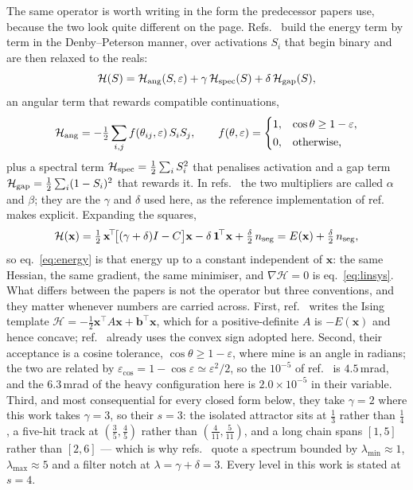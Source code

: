 \documentclass[11pt,a4paper]{article}
\begin{document}
The same operator is worth writing in the form the predecessor papers
use, because the two look quite different on the page.
Refs.~\cite{nicotra2023,trackhhl_epj,trackhhl} build the energy term by
term in the Denby--Peterson manner, over activations $S_i$ that begin
binary and are then relaxed to the reals:
\begin{equation}
\mathcal{H}(S)=\mathcal{H}_{\rm ang}(S,\varepsilon)
+\gamma\,\mathcal{H}_{\rm spec}(S)+\delta\,\mathcal{H}_{\rm gap}(S),
\label{eq:dpform}
\end{equation}
an angular term that rewards compatible continuations,
\[
\mathcal{H}_{\rm ang}=-\tfrac12\sum_{i,j}f(\theta_{ij},\varepsilon)\,S_iS_j,
\qquad
f(\theta,\varepsilon)=
\begin{cases}1,&\cos\theta\ge1-\varepsilon,\\[2pt] 0,&\text{otherwise,}\end{cases}
\]
plus a spectral term $\mathcal{H}_{\rm spec}=\tfrac12\sum_iS_i^{2}$ that
penalises activation and a gap term
$\mathcal{H}_{\rm gap}=\tfrac12\sum_i(1-S_i)^{2}$ that rewards it. In
refs.~\cite{trackhhl_epj,trackhhl} the two multipliers are called $\alpha$
and $\beta$; they are the $\gamma$ and $\delta$ used here, as the
reference implementation of ref.~\cite{trackhhl} makes explicit.
Expanding the squares,
\[
\mathcal{H}(\mathbf{x})
=\tfrac12\,\mathbf{x}^{\!\top}\!\big[(\gamma+\delta)I-C\big]\mathbf{x}
-\delta\,\mathbf{1}^{\!\top}\mathbf{x}+\tfrac{\delta}{2}\,n_{\rm seg}
=E(\mathbf{x})+\tfrac{\delta}{2}\,n_{\rm seg},
\]
so eq.~\eqref{eq:energy} is that energy up to a constant independent of
$\mathbf{x}$: the same Hessian, the same gradient, the same minimiser,
and $\nabla\mathcal{H}=0$ is eq.~\eqref{eq:linsys}. What differs between
the papers is not the operator but three conventions, and they matter
whenever numbers are carried across. First, ref.~\cite{nicotra2023}
writes the Ising template
$\mathcal{H}=-\tfrac12\mathbf{x}^{\!\top}\!A\mathbf{x}
+\mathbf{b}^{\!\top}\mathbf{x}$, which for a positive-definite $A$ is
$-E(\mathbf{x})$ and hence concave; ref.~\cite{trackhhl} already uses the
convex sign adopted here. Second, their acceptance is a cosine tolerance,
$\cos\theta\ge1-\varepsilon$, where mine is an angle in radians; the two
are related by $\varepsilon_{\cos}=1-\cos\varepsilon\simeq\varepsilon^2/2$,
so the $10^{-5}$ of ref.~\cite{nicotra2023} is $4.5$\,mrad, and the
$6.3$\,mrad of the heavy configuration here is $2.0\times10^{-5}$ in
their variable. Third, and most consequential for every closed form
below, they take $\gamma=2$ where this work takes $\gamma=3$, so their
$s=3$: the isolated attractor sits at $\tfrac13$ rather than $\tfrac14$,
a five-hit track at $(\tfrac35,\tfrac45)$ rather than
$(\tfrac{4}{11},\tfrac{5}{11})$, and a long chain spans $[1,5]$ rather
than $[2,6]$ --- which is why refs.~\cite{trackhhl_epj,trackhhl} quote a
spectrum bounded by $\lambda_{\min}\approx1$, $\lambda_{\max}\approx5$
and a filter notch at $\lambda=\gamma+\delta=3$. Every level in this work
is stated at $s=4$.
\end{document}
